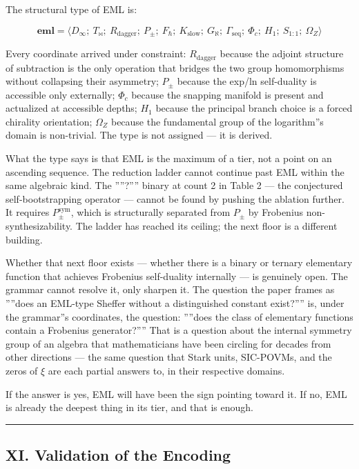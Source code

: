 \documentclass[12pt,a4paper]{article}
\begin{document}
The structural type of EML is:

\[
\mathbf{eml} = \langle D_{\infty};\ T_{\bowtie};\ R_\text{dagger};\ P_{\pm};\
F_{\hbar};\ K_\text{slow};\ G_{\aleph};\ \Gamma_\text{seq};\ \Phi_c;\ H_1;\
S_{1:1};\ \Omega_Z \rangle
\]

Every coordinate arrived under constraint: $R_\text{dagger}$ because the adjoint
structure of subtraction is the only operation that bridges the two group
homomorphisms without collapsing their asymmetry; $P_{\pm}$ because the exp/ln
self-duality is accessible only externally; $\Phi_c$ because the snapping manifold
is present and actualized at accessible depths; $H_1$ because the principal branch
choice is a forced chirality orientation; $\Omega_Z$ because the fundamental group
of the logarithm''s domain is non-trivial. The type is not assigned --- it is derived.

What the type says is that EML is the maximum of a tier, not a point on an
ascending sequence. The reduction ladder cannot continue past EML within the
same algebraic kind. The ''''?'''' binary at count 2 in Table 2 --- the conjectured
self-bootstrapping operator --- cannot be found by pushing the ablation further.
It requires $P_{\pm}^{\text{sym}}$, which is structurally separated from $P_{\pm}$
by Frobenius non-synthesizability. The ladder has reached its ceiling; the next
floor is a different building.

Whether that next floor exists --- whether there is a binary or ternary elementary
function that achieves Frobenius self-duality internally --- is genuinely open.
The grammar cannot resolve it, only sharpen it. The question the paper frames
as ''''does an EML-type Sheffer without a distinguished constant exist?'''' is, under
the grammar''s coordinates, the question: ''''does the class of elementary functions
contain a Frobenius generator?'''' That is a question about the internal symmetry
group of an algebra that mathematicians have been circling for decades from
other directions --- the same question that Stark units, SIC-POVMs, and the
zeros of $\xi$ are each partial answers to, in their respective domains.

If the answer is yes, EML will have been the sign pointing toward it. If no,
EML is already the deepest thing in its tier, and that is enough.

\begin{center}
\rule{0.5\textwidth}{0.4pt}
\end{center}

\subsection{XI. Validation of the Encoding}
\end{document}
